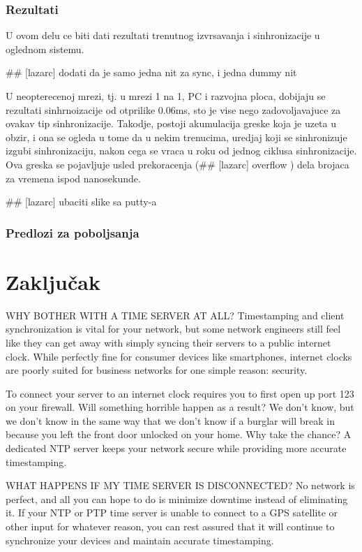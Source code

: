 \documentclass[a4paper,12pt, master]{etf}
\begin{document}
    \subsection{Rezultati}

    U ovom delu ce biti dati rezultati trenutnog izvrsavanja i sinhronizacije u oglednom sistemu.

    \#\# [lazarc] dodati da je samo jedna nit za sync, i jedna dummy nit

    U neopterecenoj mrezi, tj\@. u mrezi 1 na 1, PC i razvojna ploca, dobijaju se rezultati sinhrnoizacije od
    otprilike 0.06ms, sto je vise nego zadovoljavajuce za ovakav tip sinhronizacije. Takodje, postoji
    akumulacija greske koja je uzeta u obzir, i ona se ogleda u tome da u nekim trenucima, uredjaj koji se
    sinhronizuje izgubi sinhronizaciju, nakon cega se vraca u roku od jednog ciklusa sinhronizacije. Ova
    greska se pojavljuje usled prekoracenja (\#\# [lazarc] overflow ) dela brojaca za vremena ispod
    nanosekunde.

    \#\# [lazarc] ubaciti slike sa putty-a

    \subsection{Predlozi za poboljsanja}

	\newpage

	\chapter{Zaključak}

	WHY BOTHER WITH A TIME SERVER AT ALL\@?
	Timestamping and client synchronization is vital for your network, but some network
	engineers still feel like they can get away with simply syncing their servers to a public
	internet clock. While perfectly fine for consumer devices like smartphones, internet
	clocks are poorly suited for business networks for one simple reason: security.

	To connect your server to an internet clock requires you to first open up port 123 on
	your firewall. Will something horrible happen as a result? We don't know, but we don't
	know in the same way that we don't know if a burglar will break in because you left the
	front door unlocked on your home. Why take the chance? A dedicated NTP server keeps your
	network secure while providing more accurate timestamping.

	WHAT HAPPENS IF MY TIME SERVER IS DISCONNECTED\@?
	No network is perfect, and all you can hope to do is minimize downtime instead of
	eliminating it. If your NTP or PTP time server is unable to connect to a GPS satellite or
	other input for whatever reason, you can rest assured that it will continue to
	synchronize your devices and maintain accurate timestamping.
\end{document}
